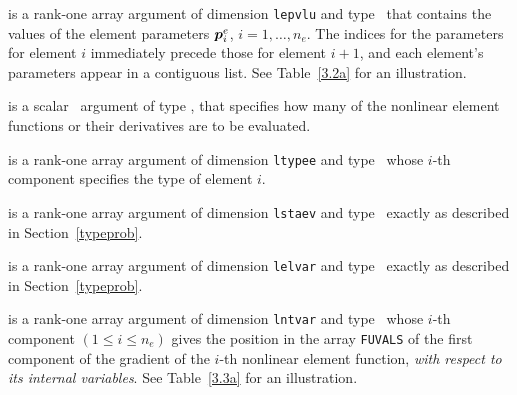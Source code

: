 \documentclass{galahad}
\begin{document}
\begin{description}
 is a rank-one \intentin array argument of
dimension {\tt lepvlu}  and type \realdp\,
that contains the values of the element parameters ${\bm{p}}^e_i$, $i = 1, \ldots,
n_e$. The indices for the parameters for element $i$ immediately precede
those for element $i+1$, and each element's parameters appear in a contiguous
list. See Table~\ref{3.2a} for an illustration.

 is a scalar \intentin\ argument of type \integer,
that specifies how many of the nonlinear element functions or their
derivatives are to be evaluated.

 is a rank-one \intentin array argument of
dimension {\tt ltypee} and type \integer\,
whose $i$-th component specifies the type of element $i$.

 is a rank-one \intentin array argument of
dimension {\tt lstaev} and type \integer\,
exactly as described in Section~\ref{typeprob}.

 is a rank-one \intentin array argument of
dimension {\tt lelvar} and type \integer\,
exactly as described in Section~\ref{typeprob}.

 is a rank-one \intentin array argument of
dimension {\tt lntvar} and type \integer\,
whose $i$-th component $(1 \leq i \leq n_e )$
gives the position in the array {\tt FUVALS} of the first component of
the gradient of the $i$-th nonlinear element function, {\em with respect
to its internal variables}.
See Table~\ref{3.3a} for an illustration.


\end{description}
\end{document}
